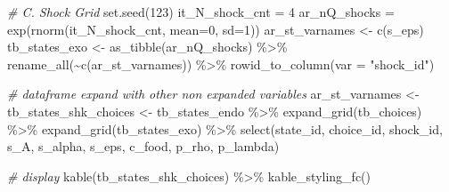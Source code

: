 \documentclass[
]{book}
\newenvironment{Shaded}{\begin{snugshade}}{\end{snugshade}}
\newcommand{\AttributeTok}[1]{\textcolor[rgb]{0.77,0.63,0.00}{#1}}
\newcommand{\CommentTok}[1]{\textcolor[rgb]{0.56,0.35,0.01}{\textit{#1}}}
\newcommand{\DecValTok}[1]{\textcolor[rgb]{0.00,0.00,0.81}{#1}}
\newcommand{\FunctionTok}[1]{\textcolor[rgb]{0.00,0.00,0.00}{#1}}
\newcommand{\NormalTok}[1]{#1}
\newcommand{\OtherTok}[1]{\textcolor[rgb]{0.56,0.35,0.01}{#1}}
\newcommand{\SpecialCharTok}[1]{\textcolor[rgb]{0.00,0.00,0.00}{#1}}
\newcommand{\StringTok}[1]{\textcolor[rgb]{0.31,0.60,0.02}{#1}}
\begin{document}
\begin{Shaded}
\begin{Highlighting}[]
\CommentTok{\# C. Shock Grid}
\FunctionTok{set.seed}\NormalTok{(}\DecValTok{123}\NormalTok{)}
\NormalTok{it\_N\_shock\_cnt }\OtherTok{=} \DecValTok{4}
\NormalTok{ar\_nQ\_shocks }\OtherTok{=} \FunctionTok{exp}\NormalTok{(}\FunctionTok{rnorm}\NormalTok{(it\_N\_shock\_cnt, }\AttributeTok{mean=}\DecValTok{0}\NormalTok{, }\AttributeTok{sd=}\DecValTok{1}\NormalTok{))}
\NormalTok{ar\_st\_varnames }\OtherTok{\textless{}{-}} \FunctionTok{c}\NormalTok{(}\StringTok{\textquotesingle{}s\_eps\textquotesingle{}}\NormalTok{)}
\NormalTok{tb\_states\_exo }\OtherTok{\textless{}{-}} \FunctionTok{as\_tibble}\NormalTok{(ar\_nQ\_shocks) }\SpecialCharTok{\%\textgreater{}\%}
  \FunctionTok{rename\_all}\NormalTok{(}\SpecialCharTok{\textasciitilde{}}\FunctionTok{c}\NormalTok{(ar\_st\_varnames)) }\SpecialCharTok{\%\textgreater{}\%}
  \FunctionTok{rowid\_to\_column}\NormalTok{(}\AttributeTok{var =} \StringTok{"shock\_id"}\NormalTok{)}

\CommentTok{\# dataframe expand with other non expanded variables}
\NormalTok{ar\_st\_varnames }\OtherTok{\textless{}{-}}
\NormalTok{tb\_states\_shk\_choices }\OtherTok{\textless{}{-}}\NormalTok{ tb\_states\_endo }\SpecialCharTok{\%\textgreater{}\%}
  \FunctionTok{expand\_grid}\NormalTok{(tb\_choices) }\SpecialCharTok{\%\textgreater{}\%}
  \FunctionTok{expand\_grid}\NormalTok{(tb\_states\_exo) }\SpecialCharTok{\%\textgreater{}\%}
  \FunctionTok{select}\NormalTok{(state\_id, choice\_id, shock\_id,}
\NormalTok{         s\_A, s\_alpha, s\_eps, c\_food,}
\NormalTok{         p\_rho, p\_lambda)}

\CommentTok{\# display}
\FunctionTok{kable}\NormalTok{(tb\_states\_shk\_choices) }\SpecialCharTok{\%\textgreater{}\%} \FunctionTok{kable\_styling\_fc}\NormalTok{()}
\end{Highlighting}
\end{Shaded}
\end{document}
